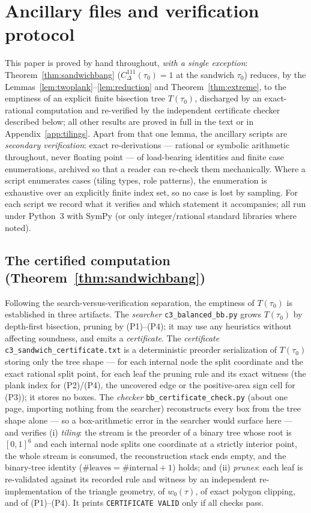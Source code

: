 \documentclass{aims}
\numberwithin{equation}{section}
\theoremstyle{plain}
\theoremstyle{definition}
\theoremstyle{remark}
\begin{document}
\section{Ancillary files and verification protocol}\label{app:ancillary}

This paper is proved by hand throughout, \emph{with a single exception}:
Theorem~\ref{thm:sandwichbang} ($C^{111}_\Delta(\tau_0)=1$ at the sandwich
$\tau_0$) reduces, by the Lemmas~\ref{lem:twoplank}--\ref{lem:reduction}
and Theorem~\ref{thm:extreme}, to the emptiness of an explicit finite
bisection tree $T(\tau_0)$, discharged by an exact-rational computation and
re-verified by the independent certificate checker described below; all other
results are proved in full in the text or in Appendix~\ref{app:tilings}. Apart
from that one lemma, the ancillary scripts are \emph{secondary verification}:
exact re-derivations --- rational or symbolic arithmetic throughout, never
floating point --- of load-bearing identities and finite case enumerations,
archived so that a reader can re-check them mechanically. Where a script
enumerates cases (tiling types, role patterns), the enumeration is exhaustive
over an explicitly finite index set, so no case is lost by sampling. For each
script we record what it verifies and which statement it accompanies; all run
under Python~3 with SymPy (or only integer/rational standard libraries where
noted).

\subsection*{The certified computation (Theorem~\ref{thm:sandwichbang})}
Following the search-versus-verification separation, the emptiness of
$T(\tau_0)$ is established in three artifacts. The \emph{searcher}
\texttt{c3\_balanced\_bb.py} grows $T(\tau_0)$ by depth-first bisection,
pruning by (P1)--(P4); it may use any heuristics without affecting soundness,
and emits a \emph{certificate}. The \emph{certificate}
\texttt{c3\_sandwich\_certificate.txt} is a deterministic preorder
serialization of $T(\tau_0)$ storing only the tree shape --- for each internal
node the split coordinate and the exact rational split point, for each leaf the
pruning rule and its exact witness (the plank index for (P2)/(P4), the
uncovered edge or the positive-area sign cell for (P3)); it stores no boxes.
The \emph{checker} \texttt{bb\_certificate\_check.py} (about one page, importing
nothing from the searcher) reconstructs every box from the tree shape alone ---
so a box-arithmetic error in the searcher would surface here --- and verifies
(i) \emph{tiling}: the stream is the preorder of a binary tree whose root is
$[0,1]^6$ and each internal node splits one coordinate at a strictly interior
point, the whole stream is consumed, the reconstruction stack ends empty, and
the binary-tree identity ($\#\text{leaves}=\#\text{internal}+1$) holds; and
(ii) \emph{prunes}: each leaf is re-validated against its recorded rule and
witness by an independent re-implementation of the triangle geometry, of
$w_0(\tau)$, of exact polygon clipping, and of (P1)--(P4). It prints
\texttt{CERTIFICATE VALID} only if all checks pass.
\end{document}
